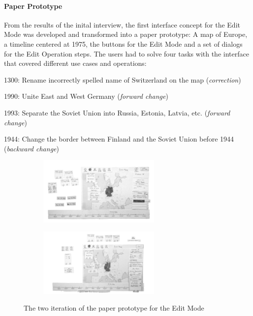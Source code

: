 

\paragraph{Paper Prototype} %
\label{par:paper_prototype}

From the results of the inital interview, the first interface concept for the Edit Mode was developed and transformed into a paper prototype: A map of Europe, a timeline centered at 1975, the buttons for the Edit Mode and a set of dialogs for the Edit Operation steps. The users had to solve four tasks with the interface that covered different use cases and operations:
\begin{compactenum}
  \item 1300: Rename incorrectly spelled name of Switzerland on the map (\emph{correction})
  \item 1990: Unite East and West Germany (\emph{forward change})
  \item 1993: Separate the Soviet Union into Russia, Estonia, Latvia, etc. (\emph{forward change})
  \item 1944: Change the border between Finland and the Soviet Union before 1944 (\emph{backward change})
\end{compactenum}

\begin{figure}[H]
\centering
\begin{subfigure}{.5\textwidth}
  \centering
  \includegraphics[width=225px]{graphics/development/design_process/paper_prototype_1.png}
\end{subfigure}%
\begin{subfigure}{.5\textwidth}
  \centering
  \includegraphics[width=225px]{graphics/development/design_process/paper_prototype_2.png}
\end{subfigure}
\caption{The two iteration of the paper prototype for the Edit Mode}
\label{fig:paper_prototypes}
\end{figure}

